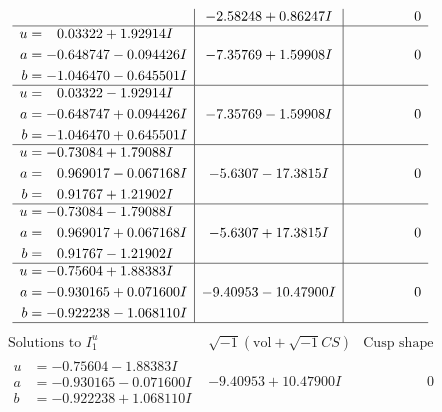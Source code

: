 \documentclass[1p]{elsarticle_modified}
\theoremstyle{definition}
\newcommand{\I}{\sqrt{-1}}
\begin{document}
$$\begin{array}{c|c|c}
 & -2.58248 + 0.86247 I & \phantom{-0.000000 } 0 \\ \hline\begin{aligned}
u &= \phantom{-}0.03322 + 1.92914 I \\
a &= -0.648747 - 0.094426 I \\
b &= -1.046470 - 0.645501 I\end{aligned}
 & -7.35769 + 1.59908 I & \phantom{-0.000000 } 0 \\ \hline\begin{aligned}
u &= \phantom{-}0.03322 - 1.92914 I \\
a &= -0.648747 + 0.094426 I \\
b &= -1.046470 + 0.645501 I\end{aligned}
 & -7.35769 - 1.59908 I & \phantom{-0.000000 } 0 \\ \hline\begin{aligned}
u &= -0.73084 + 1.79088 I \\
a &= \phantom{-}0.969017 - 0.067168 I \\
b &= \phantom{-}0.91767 + 1.21902 I\end{aligned}
 & -5.6307 - 17.3815 I & \phantom{-0.000000 } 0 \\ \hline\begin{aligned}
u &= -0.73084 - 1.79088 I \\
a &= \phantom{-}0.969017 + 0.067168 I \\
b &= \phantom{-}0.91767 - 1.21902 I\end{aligned}
 & -5.6307 + 17.3815 I & \phantom{-0.000000 } 0 \\ \hline\begin{aligned}
u &= -0.75604 + 1.88383 I \\
a &= -0.930165 + 0.071600 I \\
b &= -0.922238 - 1.068110 I\end{aligned}
 & -9.40953 - 10.47900 I & \phantom{-0.000000 } 0\\
 \hline 
 \end{array}$$\newpage$$\begin{array}{c|c|c}  
\text{Solutions to }I^u_{1}& \I (\text{vol} + \sqrt{-1}CS) & \text{Cusp shape}\\
 \hline 
\begin{aligned}
u &= -0.75604 - 1.88383 I \\
a &= -0.930165 - 0.071600 I \\
b &= -0.922238 + 1.068110 I\end{aligned}
 & -9.40953 + 10.47900 I & \phantom{-0.000000 } 0 \\ \hline\begin{aligned}

\end{aligned}
\end{array}$$
\end{document}
